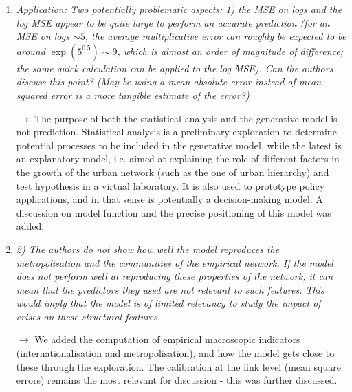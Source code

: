 \documentclass[10pt,a4paper,sans]{moderncv}
\begin{document}
\begin{enumerate}
	\medskip


	\item \textit{Application: Two potentially problematic aspects: 1) the MSE on logs and the log MSE appear to be quite large to perform an accurate prediction (for an MSE on logs $\sim 5$, the average multiplicative error can roughly be expected to be around $\exp(5^0.5) \sim 9$, which is almost an order of magnitude of difference; the same quick calculation can be applied to the log MSE). Can the authors discuss this point? (May be using a mean absolute error instead of mean squared error is a more tangible estimate of the error?)}
	
	$\rightarrow$ The purpose of both the statistical analysis and the generative model is not prediction. Statistical analysis is a preliminary exploration to determine potential processes to be included in the generative model, while the latest is an explanatory model, i.e. aimed at explaining the role of different factors in the growth of the urban network (such as the one of urban hierarchy) and test hypothesis in a virtual laboratory. It is also used to prototype policy applications, and in that sense is potentially a decision-making model. A discussion on model function and the precise positioning of this model was added.
	
	\medskip
	
	\item \textit{2) The authors do not show how well the model reproduces the metropolisation and the communities of the empirical network. If the model does not perform well at reproducing these properties of the network, it can mean that the predictors they used are not relevant to such features. This would imply that the model is of limited relevancy to study the impact of crises on these structural features.}
	
	$\rightarrow$ We added the computation of empirical macroscopic indicators (internationalisation and metropolisation), and how the model gets close to these through the exploration. The calibration at the link level (mean square errors) remains the most relevant for discussion - this was further discussed.
	
	\medskip



\end{enumerate}
\end{document}
